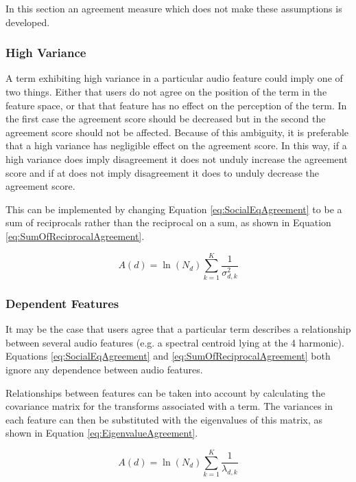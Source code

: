 		In this section an agreement measure which does not make these assumptions is developed.

		\subsubsection*{High Variance}
			A term exhibiting high variance in a particular audio feature could imply one of two things. Either
			that users do not agree on the position of the term in the feature space, or that that feature has
			no effect on the perception of the term. In the first case the agreement score should be decreased
			but in the second the agreement score should not be affected. Because of this ambiguity, it is
			preferable that a high variance has negligible effect on the agreement score. In this way, if a high
			variance does imply disagreement it does not unduly increase the agreement score and if at does not
			imply disagreement it does to unduly decrease the agreement score.
			
			This can be implemented by changing Equation \ref{eq:SocialEqAgreement} to be a sum of reciprocals
			rather than the reciprocal on a sum, as shown in Equation \ref{eq:SumOfReciprocalAgreement}.

			\begin{equation}
				A(d) = \ln(N_{d}) \sum_{k = 1}^{K} \frac{1}{\sigma_{d,k}^{2}}
				\label{eq:SumOfReciprocalAgreement}
			\end{equation}

		\subsubsection*{Dependent Features}
			It may be the case that users agree that a particular term describes a relationship between several
			audio features (e.g.  a spectral centroid lying at the 4 harmonic). Equations
			\ref{eq:SocialEqAgreement} and \ref{eq:SumOfReciprocalAgreement} both ignore any dependence between
			audio features.

			Relationships between features can be taken into account by calculating the covariance matrix for
			the transforms associated with a term. The variances in each feature can then be substituted with
			the eigenvalues of this matrix, as shown in Equation \ref{eq:EigenvalueAgreement}.

			\begin{equation}
				A(d) = \ln(N_{d}) \sum_{k = 1}^{K} \frac{1}{\lambda_{d,k}}
				\label{eq:EigenvalueAgreement}
			\end{equation}
			
